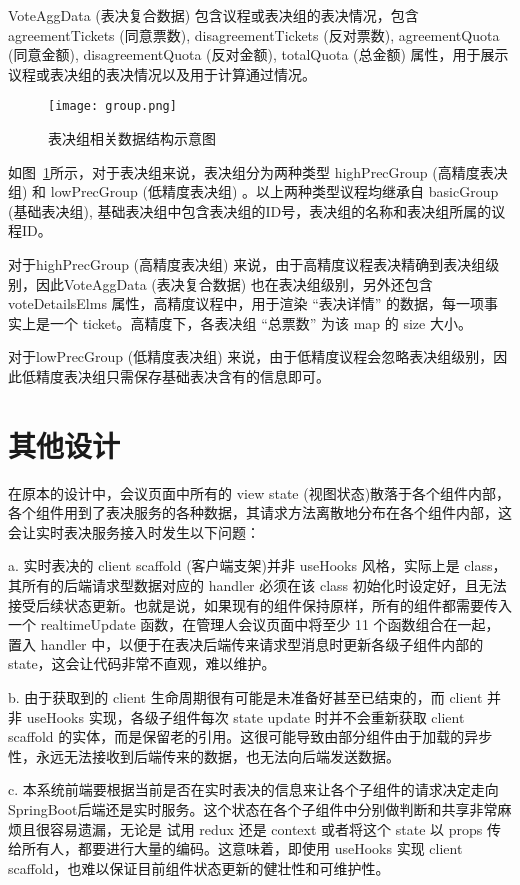   VoteAggData (表决复合数据) 包含议程或表决组的表决情况，包含 agreementTickets (同意票数), disagreementTickets (反对票数), agreementQuota (同意金额), disagreementQuota (反对金额), totalQuota (总金额) 属性，用于展示议程或表决组的表决情况以及用于计算通过情况。

  \begin{figure}[!htp]
    \centering
    \texttt{[image: group.png]}
    \caption{表决组相关数据结构示意图}
   \label{fig:group}
  \end{figure}

  如图~\ref{fig:group}所示，对于表决组来说，表决组分为两种类型 highPrecGroup (高精度表决组) 和 lowPrecGroup (低精度表决组) 。以上两种类型议程均继承自 basicGroup (基础表决组), 基础表决组中包含表决组的ID号，表决组的名称和表决组所属的议程ID。

  对于highPrecGroup (高精度表决组) 来说，由于高精度议程表决精确到表决组级别，因此VoteAggData (表决复合数据) 也在表决组级别，另外还包含 voteDetailsElms 属性，高精度议程中，用于渲染 “表决详情” 的数据，每一项事实上是一个 ticket。高精度下，各表决组 “总票数” 为该 map 的 size 大小。

  对于lowPrecGroup (低精度表决组) 来说，由于低精度议程会忽略表决组级别，因此低精度表决组只需保存基础表决含有的信息即可。

  \section{其他设计}
  在原本的设计中，会议页面中所有的 view state (视图状态)散落于各个组件内部，各个组件用到了表决服务的各种数据，其请求方法离散地分布在各个组件内部，这会让实时表决服务接入时发生以下问题：

  \quad{}a. 实时表决的 client scaffold (客户端支架)并非 useHooks 风格，实际上是 class，其所有的后端请求型数据对应的 handler 必须在该 class 初始化时设定好，且无法接受后续状态更新。也就是说，如果现有的组件保持原样，所有的组件都需要传入一个 realtimeUpdate 函数，在管理人会议页面中将至少 11 个函数组合在一起，置入 handler 中，以便于在表决后端传来请求型消息时更新各级子组件内部的 state，这会让代码非常不直观，难以维护。

  \quad{}b. 由于获取到的 client 生命周期很有可能是未准备好甚至已结束的，而 client 并非 useHooks 实现，各级子组件每次 state update 时并不会重新获取 client scaffold 的实体，而是保留老的引用。这很可能导致由部分组件由于加载的异步性，永远无法接收到后端传来的数据，也无法向后端发送数据。

  \quad{}c. 本系统前端要根据当前是否在实时表决的信息来让各个子组件的请求决定走向 SpringBoot后端还是实时服务。这个状态在各个子组件中分别做判断和共享非常麻烦且很容易遗漏，无论是 试用 redux 还是 context 或者将这个 state 以 props 传给所有人，都要进行大量的编码。这意味着，即使用 useHooks 实现 client scaffold，也难以保证目前组件状态更新的健壮性和可维护性。

